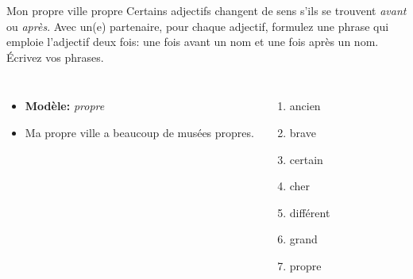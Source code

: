 \begin{frame}{Mon propre ville propre}
  Certains adjectifs changent de sens s'ils se trouvent \emph{avant} ou \emph{après}.
  Avec un(e) partenaire, pour chaque adjectif, formulez une phrase qui emploie l'adjectif deux fois: une fois avant un nom et une fois après un nom.
  Écrivez vos phrases.
  \begin{columns}
      \begin{itemize}
        \item[] \textbf{Modèle:} \emph{propre}
        \item Ma propre ville a beaucoup de musées propres.
      \end{itemize}
      \begin{enumerate}
        \item ancien
        \item brave
        \item certain
        \item cher
        \item différent
        \item grand
        \item propre
      \end{enumerate}
  \end{columns}
\end{frame}